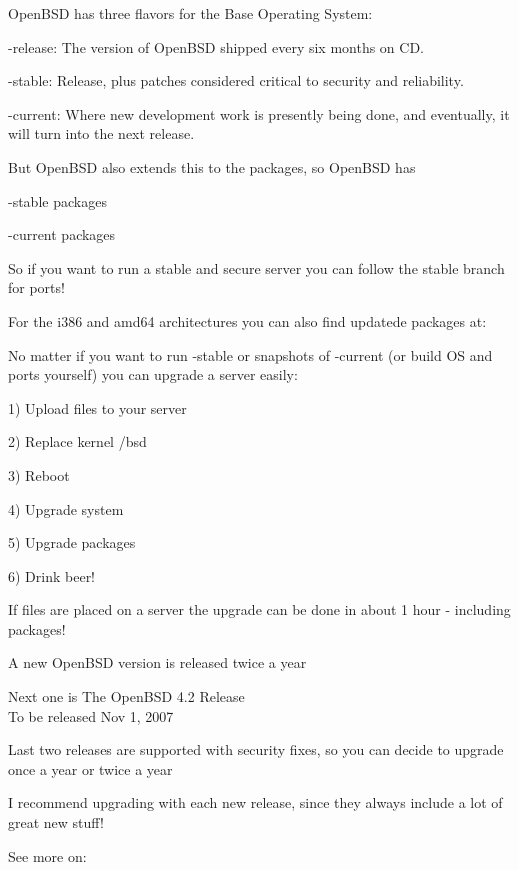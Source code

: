 \documentclass[18pt,landscape,a4paper]{foils}
\begin{document}
\begin{list1}
\item OpenBSD has three flavors for the Base Operating System:
\begin{list2}
\item -release: The version of OpenBSD shipped every six months on CD.
\item -stable: Release, plus patches considered critical to security and reliability.
\item  -current: Where new development work is presently being done,
    and eventually, it will turn into the next release. 
\end{list2}
\item But OpenBSD also extends this to the packages, so OpenBSD has
\begin{list2}
\item -stable packages
\item -current packages
\end{list2}
\item So if you want to run a stable and secure server you can follow
  the stable branch for ports!
\item For the i386 and amd64 architectures you can also find updatede
  packages at:\\
\end{list1}


\begin{list1}
\item No matter if you want to run -stable or snapshots of -current
  (or build OS and ports yourself) you can upgrade a server easily:
\item 1) Upload files to your server
\item 2) Replace kernel /bsd 
\item 3) Reboot
\item 4) Upgrade system
\item 5) Upgrade packages 
\item 6) Drink beer!
\end{list1}

If files are placed on a server the upgrade can be done in
about 1 hour - including packages!


\begin{list1}
\item A new OpenBSD version is released twice a year
\item Next one is The OpenBSD 4.2 Release\\
To be released Nov 1, 2007  
\item Last two releases are supported with security fixes, so you can
  decide to upgrade once a year or twice a year
\item I recommend upgrading with each new release, since they always
  include a lot of great new stuff!
\item See more on: 
\end{list1}
\end{document}
